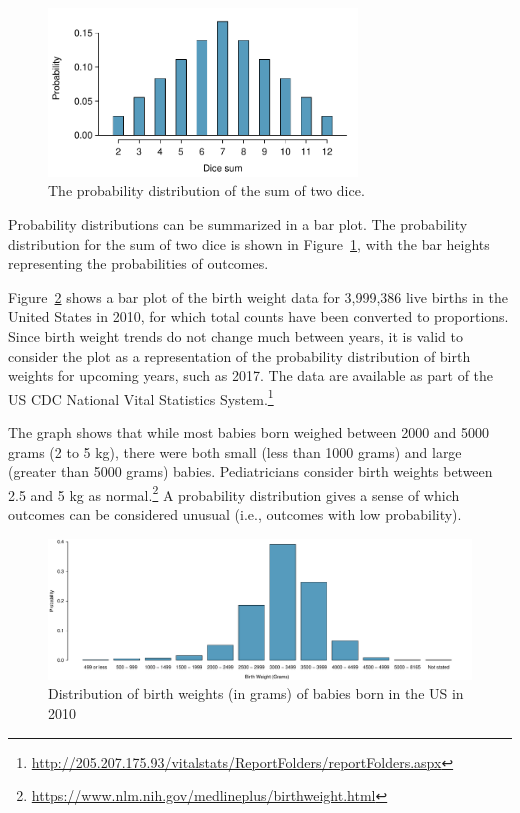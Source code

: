 \begin{figure}[h]
\centering
\includegraphics[width=0.73\textwidth]{ch_probability_oi_biostat/figures/diceSumDist/diceSumDist}
\caption{The probability distribution of the sum of two dice.}
\label{diceSumDist}
\end{figure}

Probability distributions can be summarized in a bar plot. The probability distribution for the sum of two dice is shown in Figure~\ref{diceSumDist}, with the bar heights representing the probabilities of outcomes.

Figure~\ref{fig:birthwtMarginalDist} shows a bar plot of the birth weight data for 3,999,386 live births in the United States in 2010, for which total counts have been converted to proportions. Since birth weight trends do not change much between years,  it is valid to consider the plot as a representation of the probability distribution of birth weights for upcoming years, such as 2017. The data are available as part of the US CDC National Vital Statistics System.\footnote{\url{http://205.207.175.93/vitalstats/ReportFolders/reportFolders.aspx}} 

The graph shows that while most babies born weighed between 2000 and 5000 grams (2 to 5 kg), there were both small (less than 1000 grams) and large (greater than 5000 grams) babies. Pediatricians consider birth weights between 2.5 and 5 kg as normal.\footnote{\url{https://www.nlm.nih.gov/medlineplus/birthweight.html}} A probability distribution gives a sense of which outcomes can be considered unusual (i.e., outcomes with low probability).


\begin{figure}[h]
	\includegraphics[width=\textwidth]{ch_probability_oi_biostat/figures/birthwtMarginalDist/birthwtMarginalDist.pdf}
	\caption{Distribution of birth weights (in grams) of babies born in the US in 2010}
	\label{fig:birthwtMarginalDist}
\end{figure}

